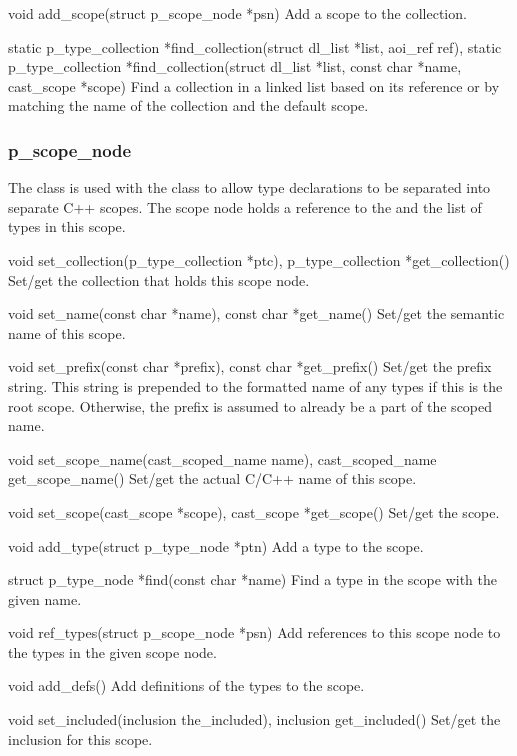 \begin{cprototypelist}
  \item[void add_scope(struct p_scope_node *psn)] Add a scope to
  the collection.

  \item[static p_type_collection *find_collection(struct dl_list
  *list, aoi_ref ref), static p_type_collection *find_collection(struct dl_list
  *list, const char *name, cast_scope *scope)] Find a collection in a linked
  list based on its \AOI{} reference or by matching the name of the collection
  and the default \CAST{} scope.
\end{cprototypelist}

\subsubsection{p_scope_node}

The  class is used with the  class
to allow type declarations to be separated into separate C++ scopes.  The scope
node holds a reference to the  and the list of types in this
scope.

\begin{cprototypelist}
  \item[void set_collection(p_type_collection *ptc),
  p_type_collection *get_collection()] Set/get the collection that holds this
  scope node.

  \item[void set_name(const char *name), const char *get_name()]
  Set/get the semantic name of this scope.

  \item[void set_prefix(const char *prefix), const char
  *get_prefix()] Set/get the prefix string.  This string is prepended to the
  formatted name of any types if this is the root scope.  Otherwise, the prefix
  is assumed to already be a part of the scoped name.

  \item[void set_scope_name(cast_scoped_name name),
  cast_scoped_name get_scope_name()] Set/get the actual C/C++ name of this
  scope.

  \item[void set_scope(cast_scope *scope), cast_scope *get_scope()]
  Set/get the \CAST{} scope.

  \item[void add_type(struct p_type_node *ptn)] Add a type to the
  scope.

  \item[struct p_type_node *find(const char *name)] Find a type in
  the scope with the given name.

  \item[void ref_types(struct p_scope_node *psn)] Add references to
  this scope node to the types in the given scope node.

  \item[void add_defs()] Add definitions of the types to the scope.

  \item[void set_included(inclusion the_included), inclusion
  get_included()] Set/get the inclusion for this scope.
\end{cprototypelist}


